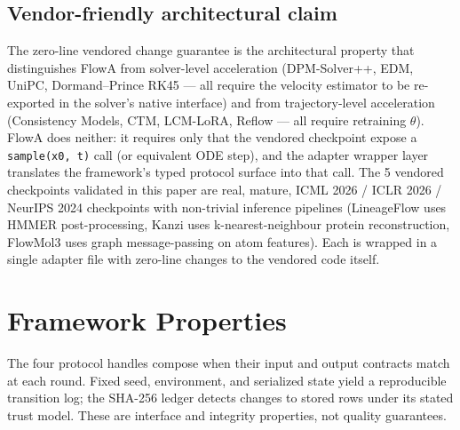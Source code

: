 \documentclass[journal,twocolumn,final]{IEEEtran}
\begin{document}
\subsection{Vendor-friendly architectural claim}

The zero-line vendored change guarantee is the architectural property that distinguishes FlowA from solver-level acceleration (DPM-Solver++, EDM, UniPC, Dormand--Prince RK45 --- all require the velocity estimator to be re-exported in the solver's native interface) and from trajectory-level acceleration (Consistency Models, CTM, LCM-LoRA, Reflow --- all require retraining $\theta$). FlowA does neither: it requires only that the vendored checkpoint expose a \texttt{sample(x0, t)} call (or equivalent ODE step), and the adapter wrapper layer translates the framework's typed protocol surface into that call. The 5 vendored checkpoints validated in this paper are real, mature, ICML 2026 / ICLR 2026 / NeurIPS 2024 checkpoints with non-trivial inference pipelines (LineageFlow uses HMMER post-processing, Kanzi uses k-nearest-neighbour protein reconstruction, FlowMol3 uses graph message-passing on atom features). Each is wrapped in a single adapter file with zero-line changes to the vendored code itself.



\section{Framework Properties}
\label{sec:properties}
The four protocol handles compose when their input and output contracts match at each round. Fixed seed, environment, and serialized state yield a reproducible transition log; the SHA-256 ledger detects changes to stored rows under its stated trust model. These are interface and integrity properties, not quality guarantees.
\end{document}
